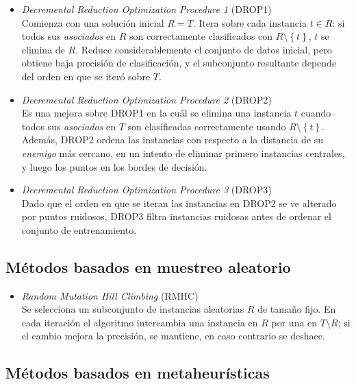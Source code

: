 \begin{itemize}
\item \emph{Decremental Reduction Optimization Procedure 1} (DROP1) \cite{Wilson:1997:IPT:645526.657143}\\
Comienza con una solución inicial $R = T$. Itera sobre cada instancia $t \in R$: si todos sus \emph{asociados} en $R$ son correctamente clasificados con $R\setminus\left\lbrace t \right\rbrace$, $t$ se elimina de $R$. Reduce considerablemente el conjunto de datos inicial, pero obtiene baja precisión de clasificación, y el subconjunto resultante depende del orden en que se iteró sobre $T$.
\item \emph{Decremental Reduction Optimization Procedure 2} (DROP2) \cite{Wilson:1997:IPT:645526.657143}\\
Es una mejora sobre DROP1 en la cuál se elimina una instancia $t$ cuando todos sus \emph{asociados} en $T$ son clasificadas correctamente usando $R\setminus\left\lbrace t \right\rbrace$. Además, DROP2 ordena las instancias con respecto a la distancia de su \emph{enemigo} más cercano, en un intento de eliminar primero instancias centrales, y luego los puntos en los bordes de decisión.
\item \emph{Decremental Reduction Optimization Procedure 3} (DROP3) \cite{Wilson:1997:IPT:645526.657143}\\
Dado que el orden en que se iteran las instancias en DROP2 se ve alterado por puntos ruidosos, DROP3 filtra instancias ruidosas antes de ordenar el conjunto de entrenamiento.
\end{itemize}

\subsection{Métodos basados en muestreo aleatorio}

\begin{itemize}
\item \emph{Random Mutation Hill Climbing} (RMHC) \cite{DBLP:conf/icml/Skalak94}\\
Se selecciona un subconjunto de instancias aleatorias $R$ de tamaño fijo. En cada iteración el algoritmo intercambia una instancia en $R$ por una en $T \setminus R$; si el cambio mejora la precisión, se mantiene, en caso contrario se deshace.
\end{itemize}

\subsection{Métodos basados en metaheurísticas}

